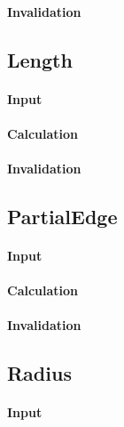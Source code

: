 \paragraph{Invalidation}

\bigskip

\subsection{Length}

\paragraph{Input}

\paragraph{Calculation}

\paragraph{Invalidation}

\bigskip

\subsection{PartialEdge}

\paragraph{Input}

\paragraph{Calculation}

\paragraph{Invalidation}

\bigskip

\subsection{Radius}

\paragraph{Input}

